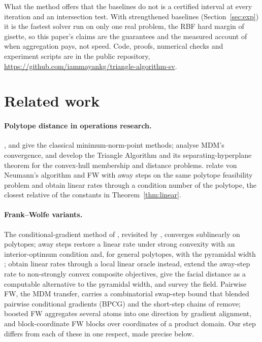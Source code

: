 \documentclass[pdflatex,sn-apa]{sn-jnl}%
\theoremstyle{thmstyleone}
\theoremstyle{thmstyletwo}
\begin{document}
What the method offers that the baselines do not is a certified
interval at every iteration and an intersection test. With strengthened
baselines (Section~\ref{sec:exp}) it is the fastest solver run on only
one real problem, the RBF hard margin of gisette, so this paper's claims
are the guarantees and the measured account of when aggregation pays,
not speed. Code, proofs, numerical checks and experiment scripts are in
the public repository,
\url{https://github.com/iammayankg/triangle-algorithm-sv}.

\section{Related work}\label{sec:related}

\paragraph{Polytope distance in operations research.}
\citet{gilbert1966}, \citet{mdm1974} and \citet{wolfe1976} give the
classical minimum-norm-point methods; \citet{lopez2015}
analyse MDM's convergence, and \citet{kalantari2015,kalantari2019}
develop the Triangle Algorithm and its separating-hyperplane theorem
for the convex-hull membership and distance problems. \citet{pena2016}
relate von Neumann's algorithm and FW with away steps on the same
polytope feasibility problem and obtain linear rates through a
condition number of the polytope, the closest relative of the constants
in Theorem~\ref{thm:linear}.

\paragraph{Frank--Wolfe variants.} The conditional-gradient method of
\citet{frankwolfe1956}, revisited by \citet{jaggi2013}, converges
sublinearly on polytopes; away steps restore a linear rate under
strong convexity with an interior-optimum condition \citep{guelat1986}
and, for general polytopes, with the pyramidal width \citep{lj2015};
\citet{garber2016} obtain linear rates through a local linear oracle
instead, \citet{beck2017} extend the away-step rate to non-strongly
convex composite objectives, \citet{pena2019} give the facial distance
as a computable alternative to the pyramidal width, and
\citet{braun2022} survey the field. Pairwise FW, the MDM transfer, carries a combinatorial
swap-step bound that blended pairwise conditional gradients (BPCG)
\citep{tsuji2022} and the short-step chains of \citet{rinaldi2023}
remove; boosted FW \citep{combettes2020} aggregates several atoms into
one direction by gradient alignment, and block-coordinate FW
\citep{lacoste2013bcfw} blocks over coordinates of a product domain.
Our step differs from each of these in one respect, made precise
below.
\end{document}
